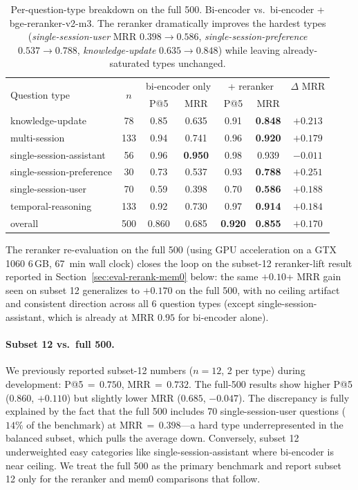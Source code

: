 \begin{table}[h]
\centering
\caption{Per-question-type breakdown on the full 500. Bi-encoder vs.\
bi-encoder + bge-reranker-v2-m3. The reranker dramatically improves
the hardest types (\emph{single-session-user} MRR
$0.398 \rightarrow 0.586$, \emph{single-session-preference}
$0.537 \rightarrow 0.788$, \emph{knowledge-update}
$0.635 \rightarrow 0.848$) while leaving already-saturated types
unchanged.}
\label{tab:longmemeval-pertype}
\small
\begin{tabular}{lcccccc}
\toprule
\multirow{2}{*}{Question type} & \multirow{2}{*}{$n$}
  & \multicolumn{2}{c}{bi-encoder only} & \multicolumn{2}{c}{+ reranker}
  & $\Delta$ MRR \\
  & & P@5 & MRR & P@5 & MRR & \\
\midrule
knowledge-update              &  78 & 0.85 & 0.635 & 0.91 & \textbf{0.848} & $+0.213$ \\
multi-session                 & 133 & 0.94 & 0.741 & 0.96 & \textbf{0.920} & $+0.179$ \\
single-session-assistant      &  56 & 0.96 & \textbf{0.950} & 0.98 & 0.939 & $-0.011$ \\
single-session-preference     &  30 & 0.73 & 0.537 & 0.93 & \textbf{0.788} & $+0.251$ \\
single-session-user           &  70 & 0.59 & 0.398 & 0.70 & \textbf{0.586} & $+0.188$ \\
temporal-reasoning            & 133 & 0.92 & 0.730 & 0.97 & \textbf{0.914} & $+0.184$ \\
\midrule
overall                       & 500 & 0.860 & 0.685 & \textbf{0.920} & \textbf{0.855} & $+0.170$ \\
\bottomrule
\end{tabular}
\end{table}

The reranker re-evaluation on the full 500 (using GPU acceleration on
a GTX 1060 6\,GB, 67~min wall clock) closes the loop on the subset-12
reranker-lift result reported in
Section~\ref{sec:eval-rerank-mem0} below: the same $+0.10$+ MRR gain
seen on subset 12 generalizes to $+0.170$ on the full 500, with no
ceiling artifact and consistent direction across all 6 question types
(except single-session-assistant, which is already at MRR $0.95$ for
bi-encoder alone).

\paragraph{Subset 12 vs.\ full 500.}
We previously reported subset-12 numbers ($n=12$, 2 per type)
during development: P@5$\,=\,0.750$, MRR$\,=\,0.732$. The full-500
results show higher P@5 ($0.860$, $+0.110$) but slightly lower
MRR ($0.685$, $-0.047$). The discrepancy is fully explained by the
fact that the full 500 includes 70 single-session-user questions
($14\%$ of the benchmark) at MRR$\,=\,0.398$---a hard type
underrepresented in the balanced subset, which pulls the average
down. Conversely, subset 12 underweighted easy categories like
single-session-assistant where bi-encoder is near ceiling. We treat
the full 500 as the primary benchmark and report subset 12 only
for the reranker and mem0 comparisons that follow.


